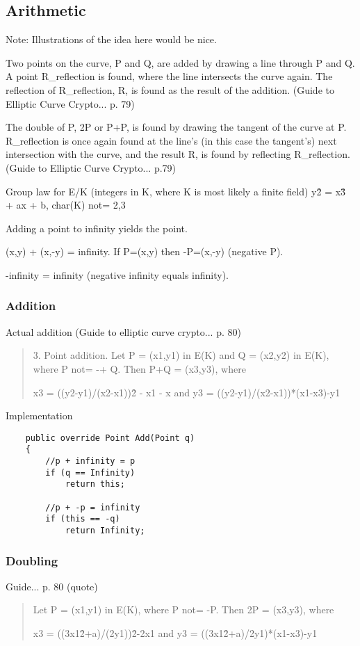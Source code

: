 \subsection{Arithmetic}

Note: Illustrations of the idea here would be nice.

Two points on the curve, P and Q, are added by drawing a line through P and Q. A point R\_reflection
is found, where the line intersects the curve again. The reflection of R\_reflection, R, is found as
the result of the addition. (Guide to Elliptic Curve Crypto... p. 79)

The double of P, 2P or P+P, is found by drawing the tangent of the curve at P. R\_reflection is once again found at the line's (in this case the tangent's) next intersection with the curve, and the result R, is found by reflecting R\_reflection. (Guide to Elliptic Curve Crypto... p.79)

Group law for E/K (integers in K, where K is most likely a finite field)
y\^2 = x\^3 + ax + b, char(K) not= 2,3

Adding a point to infinity yields the point.

(x,y) + (x,-y) = infinity. If P=(x,y) then -P=(x,-y) (negative P).

-infinity = infinity (negative infinity equals infinity).

\subsubsection{Addition}

Actual addition (Guide to elliptic curve crypto... p. 80)
\begin{quote}
	3. Point addition. Let P = (x1,y1) in E(K) and Q = (x2,y2) in E(K), where P not= -+ Q.
	Then P+Q = (x3,y3), where
	
	x3 = ((y2-y1)/(x2-x1))\^2 - x1 - x    and    y3 = ((y2-y1)/(x2-x1))*(x1-x3)-y1
\end{quote}

Implementation
\begin{verbatim}
	public override Point Add(Point q)
	{
	    //p + infinity = p
	    if (q == Infinity)
	        return this;

	    //p + -p = infinity
	    if (this == -q)
	        return Infinity;
\end{verbatim}

\subsubsection{Doubling}

Guide... p. 80 (quote)
\begin{quote}
	Let P = (x1,y1) in E(K), where P not= -P. Then 2P = (x3,y3), where
	
	x3 = ((3x1\^2+a)/(2y1))\^2-2x1    and    y3 = ((3x1\^2+a)/2y1)*(x1-x3)-y1
\end{quote}